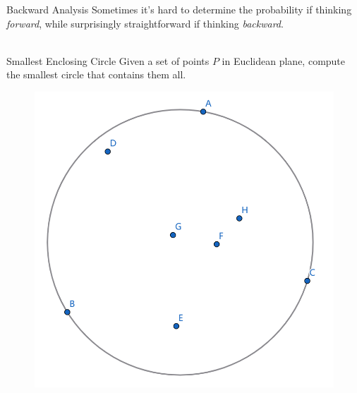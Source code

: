 \documentclass{beamer}
\newcommand{\lf}{\left[}
\newcommand{\rf}{\right]}
\begin{document}
\begin{frame}{Backward Analysis}
    Sometimes it's hard to determine the probability if thinking \textit{forward}, while surprisingly straightforward if thinking \textit{backward}. \\~\

    \begin{block}{Smallest Enclosing Circle}
        Given a set of points $P$ in Euclidean plane, compute the smallest circle that contains them all.
    \end{block}

    \begin{figure}[r]
        \includegraphics[width=0.4\linewidth]{pics/smallest_enclosing_circle_illustration.png}
    \end{figure}






    
\end{frame}
\end{document}

